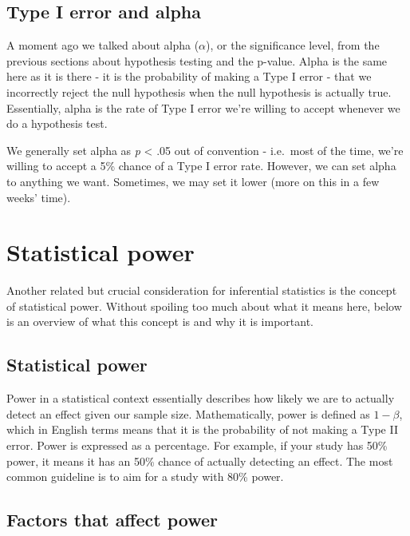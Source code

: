 \documentclass[
]{book}
\begin{document}
\subsection{Type I error and alpha}\label{type-i-error-and-alpha}

A moment ago we talked about alpha (\(\alpha\)), or the significance level, from the previous sections about hypothesis testing and the p-value. Alpha is the same here as it is there - it is the probability of making a Type I error - that we incorrectly reject the null hypothesis when the null hypothesis is actually true. Essentially, alpha is the rate of Type I error we're willing to accept whenever we do a hypothesis test.

We generally set alpha as \emph{p} \textless{} .05 out of convention - i.e.~most of the time, we're willing to accept a 5\% chance of a Type I error rate. However, we can set alpha to anything we want. Sometimes, we may set it lower (more on this in a few weeks' time).

\section{Statistical power}\label{statistical-power}

Another related but crucial consideration for inferential statistics is the concept of statistical power. Without spoiling too much about what it means here, below is an overview of what this concept is and why it is important.

\subsection{Statistical power}\label{statistical-power-1}

Power in a statistical context essentially describes how likely we are to actually detect an effect given our sample size. Mathematically, power is defined as \(1 - \beta\), which in English terms means that it is the probability of not making a Type II error. Power is expressed as a percentage. For example, if your study has 50\% power, it means it has an 50\% chance of actually detecting an effect. The most common guideline is to aim for a study with 80\% power.

\subsection{Factors that affect power}\label{factors-that-affect-power}
\end{document}
